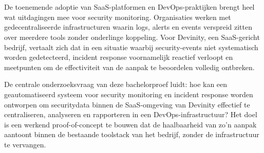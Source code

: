 
%
%
%
%
%




\chapter*{}


De toenemende adoptie van SaaS-platformen en DevOps-praktijken brengt heel wat uitdagingen mee voor security monitoring. Organisaties werken met gedecentraliseerde infrastructuren waarin logs, alerts en events verspreid zitten over meerdere tools zonder onderlinge koppeling. Voor Devinity, een SaaS-gericht bedrijf, vertaalt zich dat in een situatie waarbij security-events niet systematisch worden gedetecteerd, incident response voornamelijk reactief verloopt en meetpunten om de effectiviteit van de aanpak te beoordelen volledig ontbreken.

De centrale onderzoeksvraag van deze bachelorproef luidt: hoe kan een geautomatiseerd systeem voor security monitoring en incident response worden ontworpen om securitydata binnen de SaaS-omgeving van Devinity effectief te centraliseren, analyseren en rapporteren in een DevOps-infrastructuur? Het doel is een werkend proof-of-concept te bouwen dat de haalbaarheid van zo'n aanpak aantoont binnen de bestaande toolstack van het bedrijf, zonder de infrastructuur te vervangen.

